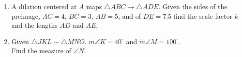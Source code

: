 \documentclass[12pt, twoside]{article}
\begin{document}
\begin{enumerate}
  \item A dilation centered at $A$ maps $\triangle ABC \rightarrow \triangle ADE$. Given the sides of the preimage, $AC = 4$, $BC = 3$, $AB = 5$, and of $DE = 7.5$ find the scale factor $k$ and the lengths $AD$ and $AE$.
    \begin{flushright}
    \end{flushright} \vspace{1.5cm}    


  \item Given $\triangle JKL \sim \triangle MNO$. $m\angle K = 40^\circ$ and $m\angle M = 100^\circ$.\\
  Find the measure of $\angle N$. \vspace{3cm}

\end{enumerate}
\end{document}
